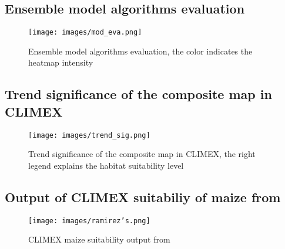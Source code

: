 \pagebreak

\subsection{Ensemble model algorithms evaluation}
\begin{figure*}[!ht]
	\centering
	\texttt{[image: images/mod\_eva.png]}
	\caption{Ensemble model algorithms evaluation, the color indicates the heatmap intensity}
	\label{fig:Ensemble model algorithms evaluation}
\end{figure*}

\subsection{Trend significance of the composite map in CLIMEX}
\begin{figure*}[!ht]
	\centering
	\texttt{[image: images/trend\_sig.png]}
	\caption{Trend significance of the composite map in CLIMEX, the right legend explains the habitat suitability level}
	\label{fig:Trend significance of the composite map in CLIMEX}
\end{figure*}

\pagebreak
\subsection{Output of CLIMEX suitabiliy of maize from \citep{ramirez2017global}}
\begin{figure*}[!ht]
	\centering
	\texttt{[image: images/ramirez's.png]}
	\caption{CLIMEX maize suitability output from \citep{ramirez2017global}}
	\label{fig:CLIMEX maize output}
\end{figure*}


